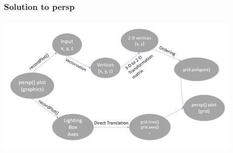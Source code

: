 \documentclass{beamer}
\begin{document}
\begin{frame}[fragile]
\frametitle{Solution to persp}
\includegraphics[height = 7cm, width = 12cm]{plot/persp_step_by_step.png}

\end{frame}



\end{document}
